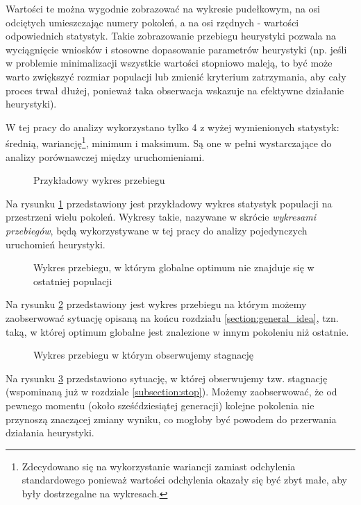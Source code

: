 \documentclass[twoside]{iisthesis}
\newcommand{\graph}[1]{}
\begin{document}
Wartości te można wygodnie zobrazować na wykresie pudełkowym, na osi odciętych umieszczając numery pokoleń, a na osi rzędnych - wartości odpowiednich statystyk. Takie zobrazowanie przebiegu heurystyki pozwala na wyciągnięcie wniosków i stosowne dopasowanie parametrów heurystyki (np. jeśli w problemie minimalizacji wszystkie wartości stopniowo maleją, to być może warto zwiększyć rozmiar populacji lub zmienić kryterium zatrzymania, aby cały proces trwał dłużej, ponieważ taka obserwacja wskazuje na efektywne działanie heurystyki).

W tej pracy do analizy wykorzystano tylko 4 z wyżej wymienionych statystyk: średnią, wariancję\footnote{Zdecydowano się na wykorzystanie wariancji zamiast odchylenia standardowego ponieważ wartości odchylenia okazały się być zbyt małe, aby były dostrzegalne na wykresach.}, minimum i maksimum. Są one w pełni wystarczające do analizy porównawczej między uruchomieniami. 


\begin{figure}[H]
	\caption{Przykładowy wykres przebiegu \label{plot:random_example}}
	\centering
	\graph{random_example.tex}
\end{figure}

Na rysunku \ref{plot:random_example} przedstawiony jest przykładowy wykres statystyk populacji na przestrzeni wielu pokoleń. Wykresy takie, nazywane w skrócie \emph{wykresami przebiegów}, będą wykorzystywane w tej pracy do analizy pojedynczych uruchomień heurystyki. 

\begin{figure}[H]
	\caption{Wykres przebiegu, w którym globalne optimum nie znajduje się w ostatniej populacji \label{plot:mid_opt}}
	\centering
	\graph{mid_optimum.tex}
\end{figure}

Na rysunku \ref{plot:mid_opt} przedstawiony jest wykres przebiegu na którym możemy zaobserwować sytuację opisaną na końcu rozdziału \ref{section:general_idea}, tzn. taką, w której optimum globalne jest znalezione w innym pokoleniu niż ostatnie.

\begin{figure}[H]
	\caption{Wykres przebiegu w którym obserwujemy stagnację \label{plot:stagnation}}
	\centering
	\graph{stagnation.tex}
\end{figure}

Na rysunku \ref{plot:stagnation} przedstawiono sytuację, w której obserwujemy tzw. stagnację (wspominaną już w rozdziale \ref{subsection:stop}). Możemy zaobserwować, że od pewnego momentu (około sześćdziesiątej generacji) kolejne pokolenia nie przynoszą znaczącej zmiany wyniku, co mogłoby być powodem do przerwania działania heurystyki.
\end{document}
